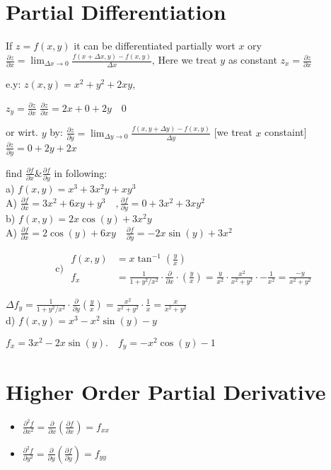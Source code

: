 \documentclass[12pt, a4paper]{article}
\begin{document}
\section*{Partial Differentiation}
If $z=f(x, y)$ it can be differentiated partially wort $x$ ory $\frac{\partial z}{\partial x}=\lim _{\Delta x \rightarrow 0} \frac{f(x+\Delta x, y)-f(x, y)}{\Delta x}$, Here we treat $y$ as constant $z_{x}=\frac{\partial z}{\partial x}$

e.y: $z(x, y)=x^2 +y^2+2 x y$,

$z_{y}=\frac{\partial z}{\partial x}$ $\frac{\partial z}{\partial x}=2 x+0+2 y \quad 0$

or wirt. $y$ by: $\frac{\partial z}{\partial y}=\lim _{\Delta y \rightarrow 0} \frac{f(x, y+\Delta y)-f(x, y)}{\Delta y}$ [we treat $x$ constaint] $\frac{\partial z}{\partial y}=0+2 y+2 x$

find $\frac{\partial f}{\partial x} \& \frac{\partial f}{\partial y}$ in following:\\
a) $f(x, y)=x^{3}+3 x^2 y+x y^{3}$\\
A) $\frac{\partial f}{\partial x}=3 x^2 +6 x y+y^{3} \quad, \frac{\partial f}{\partial y}=0+3 x^2 +3 x y^2$\\
b) $f(x, y)=2 x \cos(y)+3 x^2 y$\\
A) $\frac{\partial f}{\partial x}=2 \cos(y)+6 x y \quad \frac{\partial f}{\partial y}=-2 x \sin(y)+3 x^2 $

$$
	\text{ c) } \begin{aligned}
		f(x, y) & =x \tan ^{-1}\left(\frac{y}{x}\right)                                                                                                                                       \\
		f_{x}   & =\frac{1}{1+y^2 / x^2 } \cdot \frac{\partial}{\partial x} \cdot\left(\frac{y}{x}\right)=\frac{y}{x^2 } \cdot \frac{x^2 }{x^2 +y^2} \cdot-\frac{1}{x^2 }=\frac{-y}{x^2 +y^2}
	\end{aligned}
$$

$\Delta f_{y}=\frac{1}{1+y^2 / x^2 } \cdot \frac{\partial}{\partial y}\left(\frac{y}{x}\right)=\frac{x^2 }{x^2 +y^2} \cdot \frac{1}{x}=\frac{x}{x^2 +y^2}$\\
d) $f(x, y)=x^{3}-x^2 \sin(y)-y$

$f_{x}=3 x^2 -2 x \sin(y) . \quad f_{y}=-x^2 \cos(y)-1$

\section*{Higher Order Partial Derivative}
\begin{itemize}
	\item $\frac{\partial^{2} f}{\partial x^2 }=\frac{\partial}{\partial x}\left(\frac{\partial f}{\partial x}\right)=f_{x x}$
	\item $\frac{\partial^{2} f}{\partial y^2}=\frac{\partial}{\partial y}\left(\frac{\partial f}{\partial y}\right)=f_{y y}$
\end{itemize}
\end{document}
